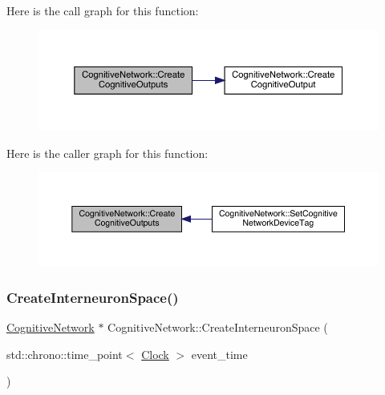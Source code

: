 Here is the call graph for this function\+:
\nopagebreak
\begin{figure}[H]
\begin{center}
\leavevmode
\includegraphics[width=350pt]{class_cognitive_network_a002df11f4389a122fc140c186ab665c9_cgraph}
\end{center}
\end{figure}
Here is the caller graph for this function\+:
\nopagebreak
\begin{figure}[H]
\begin{center}
\leavevmode
\includegraphics[width=350pt]{class_cognitive_network_a002df11f4389a122fc140c186ab665c9_icgraph}
\end{center}
\end{figure}
\mbox{\label{class_cognitive_network_af0dc86c7905baae6f2b5efb3a65b8819}} 
\subsubsection{\texorpdfstring{Create\+Interneuron\+Space()}{CreateInterneuronSpace()}}
{\footnotesize\ttfamily \hyperlink{class_cognitive_network}{Cognitive\+Network} $\ast$ Cognitive\+Network\+::\+Create\+Interneuron\+Space (\begin{DoxyParamCaption}\item[{std\+::chrono\+::time\+\_\+point$<$ \hyperlink{universe_8h_a0ef8d951d1ca5ab3cfaf7ab4c7a6fd80}{Clock} $>$}]{event\+\_\+time }\end{DoxyParamCaption})}



